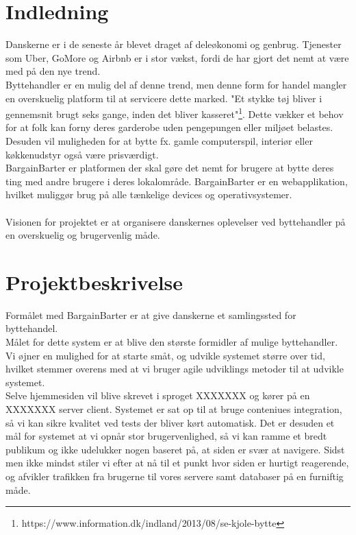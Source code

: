 \chapter{Indledning}\label{ch:Indledning}
Danskerne er i de seneste år blevet draget af deleøkonomi og genbrug. Tjenester som Uber, GoMore og Airbnb er i stor vækst, fordi de har gjort det nemt at være med på den nye trend. \\Byttehandler er en mulig del af denne trend, men denne form for handel mangler en overskuelig platform til at servicere dette marked. "Et stykke tøj bliver i gennemsnit brugt seks gange, inden det bliver kasseret"\footnote{https://www.information.dk/indland/2013/08/se-kjole-bytte}. Dette vækker et behov for at folk kan forny deres garderobe uden pengepungen eller miljøet belastes. Desuden vil muligheden for at bytte fx. gamle computerspil, interiør eller køkkenudstyr også være prisværdigt. \\
BargainBarter er platformen der skal gøre det nemt for brugere at bytte deres ting med andre brugere i deres lokalområde. BargainBarter er en webapplikation, hvilket muliggør brug på alle tænkelige devices og operativsystemer. \\ \\
Visionen for projektet er at organisere danskernes oplevelser ved byttehandler på en overskuelig og brugervenlig måde. 


\chapter{Projektbeskrivelse}\label{ch:Projektbeskrivelse}
Formålet med BargainBarter er at give danskerne et samlingssted for byttehandel. \\
Målet for dette system er at blive den største formidler af mulige byttehandler. Vi øjner en mulighed for at starte småt, og udvikle systemet større over tid, hvilket stemmer overens med at vi bruger agile udviklings metoder til at udvikle systemet. \\ Selve hjemmesiden vil blive skrevet i sproget XXXXXXX og kører på en XXXXXXX server client. Systemet er sat op til at bruge conteniues integration, så vi kan sikre kvalitet ved tests der bliver kørt automatisk. Det er desuden et mål for systemet at vi opnår stor brugervenlighed, så vi kan ramme et bredt publikum og ikke udelukker nogen baseret på, at siden er svær at navigere. Sidst men ikke mindst stiler vi efter at nå til et punkt hvor siden er hurtigt reagerende, og afvikler trafikken fra brugerne til vores servere samt databaser på en furniftig måde. 


